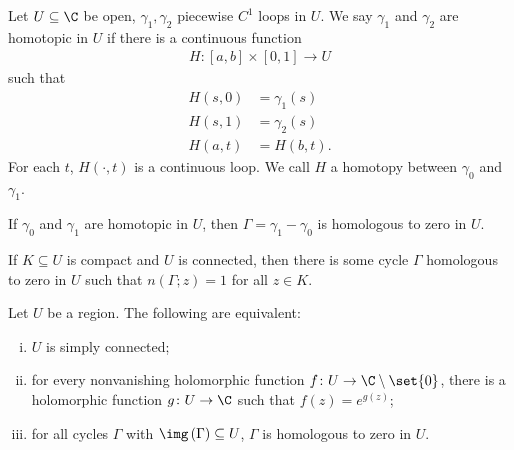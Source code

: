 \documentclass[10pt]{mypackage}
\begin{document}
\begin{definition}
  Let $U\subseteq \C$ be open, $\gamma_1,\gamma_2$ piecewise $C^{1}$ loops in $U$. We say $\gamma_1$ and $\gamma_2$ are homotopic in $U$ if there is a continuous function
  \begin{align*}
    H\colon [a,b]\times [0,1]\rightarrow U
  \end{align*}
  such that
  \begin{align*}
    H\left( s,0 \right) &= \gamma_1(s)\\
    H\left( s,1 \right) &= \gamma_2(s)\\
    H\left( a,t \right) &= H\left( b,t \right).
  \end{align*}
  For each $t$, $H\left( \cdot,t \right)$ is a continuous loop. We call $H$ a homotopy between $\gamma_0$ and $\gamma_1$.
\end{definition}
\begin{theorem}
  If $\gamma_0$ and $\gamma_1$ are homotopic in $U$, then $\Gamma = \gamma_1-\gamma_0$ is homologous to zero in $U$.
\end{theorem}
\begin{theorem}
  If $K\subseteq U$ is compact and $U$ is connected, then there is some cycle $\Gamma$ homologous to zero in $U$ such that $n\left( \Gamma;z \right) = 1$ for all $z\in K$.
\end{theorem}
\begin{corollary}
  Let $U$ be a region. The following are equivalent:
  \begin{enumerate}[(i)]
    \item $U$ is simply connected;
    \item for every nonvanishing holomorphic function $f\colon U\rightarrow \C\setminus \set{0}$, there is a holomorphic function $g\colon U\rightarrow \C$ such that $f(z) = e^{g(z)}$;
    \item for all cycles $\Gamma$ with $\img\left( \Gamma \right)\subseteq U$, $\Gamma$ is homologous to zero in $U$.
  \end{enumerate}
\end{corollary}
\end{document}
